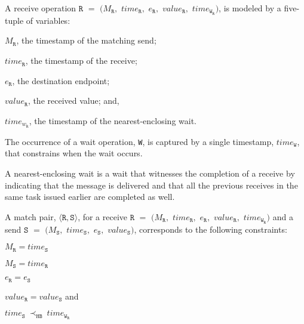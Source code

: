 \begin{definition}[Receive] \label{def:rcv}
A receive operation $\mathtt{R}$ $=$ $(M_\mathtt{R},$ $\mathit{time}_\mathtt{R},$ $e_\mathtt{R},$ $\mathit{value}_\mathtt{R},$ $\mathit{time}_{\mathtt{W}_\mathtt{R}})$, is modeled by a five-tuple of variables:
\begin{compactenum}
\item $M_\mathtt{R}$, the timestamp of the matching send;
\item $\mathit{time}_\mathtt{R}$, the timestamp of the receive;
\item $e_\mathtt{R}$, the destination endpoint;
\item $\mathit{value}_\mathtt{R}$, the received value; and,
\item $\mathit{time}_{\mathit{w}_\mathtt{R}}$, the timestamp of the nearest-enclosing wait.
\end{compactenum}
\end{definition}

\begin{definition}[Wait] \label{def:wait}
The occurrence of a wait operation, \texttt{W}, is captured by a
single timestamp, $\mathit{time}_\mathtt{W}$, that constrains when
the wait occurs.
\end{definition}

\begin{definition} \label{def:nw}

A nearest-enclosing wait is a wait that witnesses the completion of a receive by indicating that
the message is delivered and that all the previous receives in the
same task issued earlier are completed as well.
\end{definition}

\begin{definition} \label{def:match}
A match pair, $\langle\mathtt{R}, \mathtt{S}\rangle$, for a receive 
$\mathtt{R}$ $=$ $(M_\mathtt{R},$ $\mathit{time}_\mathtt{R},$ $e_\mathtt{R},$ $\mathit{value}_\mathtt{R},$ $\mathit{time}_{\mathtt{W}_\mathtt{R}})$ and a send $\mathtt{S}$ $=$ $(M_\mathtt{S},$ $\mathit{time}_\mathtt{S},$ $e_\mathtt{S},$ $\mathit{value}_\mathtt{S})$, corresponds to the following constraints:
\begin{compactenum}
\item $M_{\mathtt{R}} = \mathit{time}_{\mathtt{S}}$
\item $M_{\mathtt{S}} = \mathit{time}_{\mathtt{R}}$
\item $e_{\mathtt{R}} = e_{\mathtt{S}}$
\item $\mathit{value}_{\mathtt{R}} = \mathit{value}_{\mathtt{S}}$ and
\item $\mathit{time}_{\mathtt{S}}\ \mathrm{\prec_\mathtt{HB}}\ \mathit{time}_{\mathtt{W}_\mathtt{R}}$
\end{compactenum}
\end{definition}

